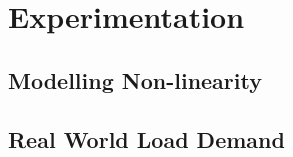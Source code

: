\section{Experimentation}


\subsection{Modelling Non-linearity}


\subsection{Real World Load Demand}